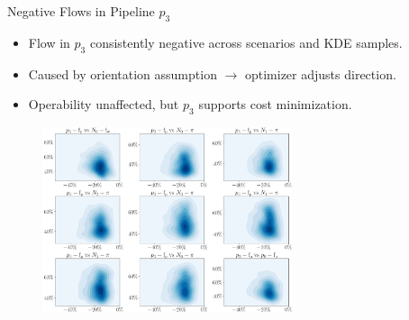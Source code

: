 \documentclass[hyperref={colorlinks,citecolor=blue,linkcolor=blue,urlcolor=blue}]{beamer}
\begin{document}

\begin{frame}{Negative Flows in Pipeline $p_3$}
\scriptsize
    \begin{itemize}
        \item Flow in $p_3$ consistently negative across scenarios and KDE samples.
        \item Caused by orientation assumption $\rightarrow$ optimizer adjusts direction.
        \item Operability unaffected, but $p_3$ supports cost minimization.
    \end{itemize}
    \begin{figure}
        \includegraphics[width=0.65\textwidth]{figures/outputs_outputs_2_cut.png}
    \end{figure}
\end{frame}
\end{document}
